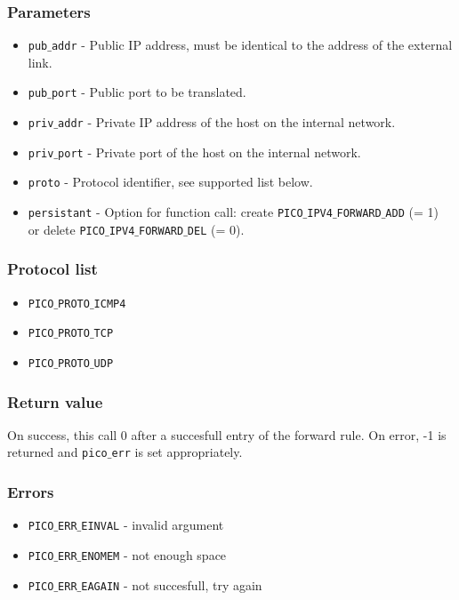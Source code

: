 \subsubsection*{Parameters}
\begin{itemize}[noitemsep]
\item \texttt{pub$\_$addr} - Public IP address, must be identical to the address of the external link.
\item \texttt{pub$\_$port} - Public port to be translated.
\item \texttt{priv$\_$addr} - Private IP address of the host on the internal network.
\item \texttt{priv$\_$port} - Private port of the host on the internal network.
\item \texttt{proto} - Protocol identifier, see supported list below.
\item \texttt{persistant} - Option for function call: create \texttt{PICO$\_$IPV4$\_$FORWARD$\_$ADD} (= 1) \\
or delete \texttt{PICO$\_$IPV4$\_$FORWARD$\_$DEL} (= 0).
\end{itemize}

\subsubsection*{Protocol list}
\begin{itemize}[noitemsep]
\item \texttt{PICO$\_$PROTO$\_$ICMP4}
\item \texttt{PICO$\_$PROTO$\_$TCP}
\item \texttt{PICO$\_$PROTO$\_$UDP}
\end{itemize}

\subsubsection*{Return value}
On success, this call 0 after a succesfull entry of the forward rule.
On error, -1 is returned and \texttt{pico$\_$err} is set appropriately.

\subsubsection*{Errors}
\begin{itemize}[noitemsep]
\item \texttt{PICO$\_$ERR$\_$EINVAL} - invalid argument
\item \texttt{PICO$\_$ERR$\_$ENOMEM} - not enough space
\item \texttt{PICO$\_$ERR$\_$EAGAIN} - not succesfull, try again
\end{itemize}

